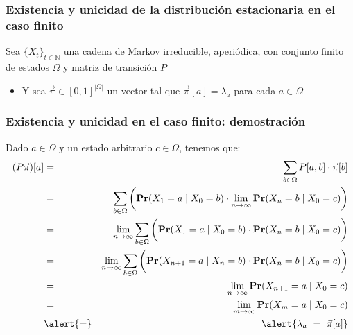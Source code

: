 \begin{frame}
\frametitle{Existencia y unicidad de la distribución estacionaria en el caso finito}

{\small

Sea $\{ X_t \}_{t \in \mathbb{N}}$ una cadena de Markov irreducible, aperiódica, con conjunto finito de estados $\Omega$ y matriz de transición $P$
\begin{itemize}
\item Y sea $\vec \pi \in [0,1]^{|\Omega|}$ un vector tal que $\vec \pi[a] = \lambda_a$ para cada $a \in \Omega$
\end{itemize}






}

\end{frame}

\begin{frame}
\frametitle{Existencia y unicidad en el caso finito: demostración}

{\footnotesize

Dado $a \in \Omega$ y un estado arbitrario $c \in \Omega$, tenemos que:
\begin{eqnarray*}
(P \vec \pi)[a] & = & \sum_{b \in \Omega} P[a,b] \cdot \vec \pi[b]\\
& = & \sum_{b \in \Omega} \bigg(\pr(X_1 = a \mid X_0 = b) \cdot \lim_{n \to \infty} \pr(X_n = b \mid X_0 = c)\bigg)\\
& = & \lim_{n \to \infty} \sum_{b \in \Omega}  \bigg(\pr(X_1 = a \mid X_0 = b) \cdot  \pr(X_n = b \mid X_0 = c)\bigg)\\
& = & \lim_{n \to \infty} \sum_{b \in \Omega}  \bigg(\pr(X_{n+1} = a \mid X_n = b) \cdot  \pr(X_n = b \mid X_0 = c)\bigg)\\
& = & \lim_{n \to \infty} \pr(X_{n+1} = a \mid X_0 = c)\\
& = & \lim_{m \to \infty} \pr(X_{m} = a \mid X_0 = c)\\
& \alert{=} & \alert{\lambda_a \ = \ \vec \pi[a]}
\end{eqnarray*}
}

\end{frame}



